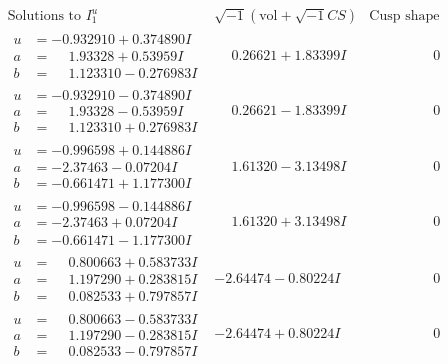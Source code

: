 \documentclass[1p]{elsarticle_modified}
\theoremstyle{definition}
\newcommand{\I}{\sqrt{-1}}
\begin{document}
$$\begin{array}{c|c|c}  
\text{Solutions to }I^u_{1}& \I (\text{vol} + \sqrt{-1}CS) & \text{Cusp shape}\\
 \hline 
\begin{aligned}
u &= -0.932910 + 0.374890 I \\
a &= \phantom{-}1.93328 + 0.53959 I \\
b &= \phantom{-}1.123310 - 0.276983 I\end{aligned}
 & \phantom{-}0.26621 + 1.83399 I & \phantom{-0.000000 } 0 \\ \hline\begin{aligned}
u &= -0.932910 - 0.374890 I \\
a &= \phantom{-}1.93328 - 0.53959 I \\
b &= \phantom{-}1.123310 + 0.276983 I\end{aligned}
 & \phantom{-}0.26621 - 1.83399 I & \phantom{-0.000000 } 0 \\ \hline\begin{aligned}
u &= -0.996598 + 0.144886 I \\
a &= -2.37463 - 0.07204 I \\
b &= -0.661471 + 1.177300 I\end{aligned}
 & \phantom{-}1.61320 - 3.13498 I & \phantom{-0.000000 } 0 \\ \hline\begin{aligned}
u &= -0.996598 - 0.144886 I \\
a &= -2.37463 + 0.07204 I \\
b &= -0.661471 - 1.177300 I\end{aligned}
 & \phantom{-}1.61320 + 3.13498 I & \phantom{-0.000000 } 0 \\ \hline\begin{aligned}
u &= \phantom{-}0.800663 + 0.583733 I \\
a &= \phantom{-}1.197290 + 0.283815 I \\
b &= \phantom{-}0.082533 + 0.797857 I\end{aligned}
 & -2.64474 - 0.80224 I & \phantom{-0.000000 } 0 \\ \hline\begin{aligned}
u &= \phantom{-}0.800663 - 0.583733 I \\
a &= \phantom{-}1.197290 - 0.283815 I \\
b &= \phantom{-}0.082533 - 0.797857 I\end{aligned}
 & -2.64474 + 0.80224 I & \phantom{-0.000000 } 0 \\ \hline\begin{aligned}

\end{aligned}
\end{array}$$
\end{document}
